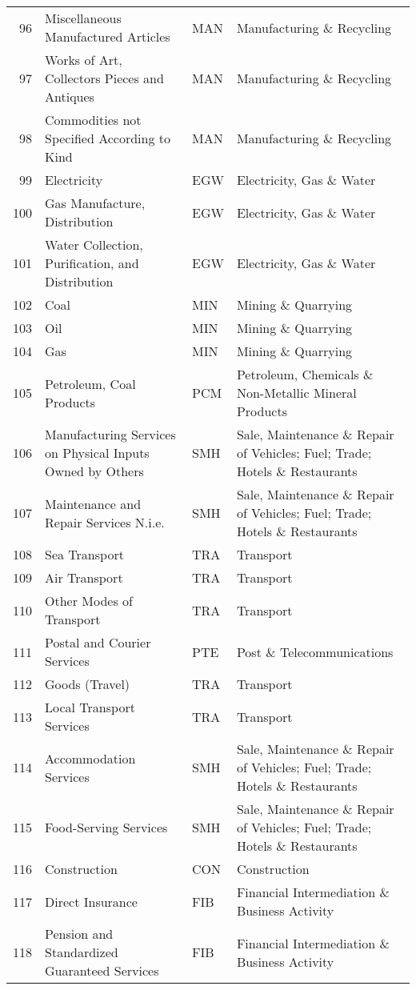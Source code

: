 \documentclass[a4paper]{article}
\begin{document}
\begin{table}[ht]
{\begin{tabular}{rlll}
  96 & Miscellaneous Manufactured Articles & MAN & Manufacturing \& Recycling \\ 
  97 & Works of Art, Collectors Pieces and Antiques & MAN & Manufacturing \& Recycling \\ 
  98 & Commodities not Specified According to Kind & MAN & Manufacturing \& Recycling \\ 
  99 & Electricity & EGW & Electricity, Gas \& Water \\ 
  100 & Gas Manufacture, Distribution & EGW & Electricity, Gas \& Water \\ 
  101 & Water Collection, Puriﬁcation, and Distribution & EGW & Electricity, Gas \& Water \\ 
  102 & Coal & MIN & Mining \& Quarrying \\ 
  103 & Oil & MIN & Mining \& Quarrying \\ 
  104 & Gas & MIN & Mining \& Quarrying \\ 
  105 & Petroleum, Coal Products & PCM & Petroleum, Chemicals \& Non-Metallic Mineral Products \\ 
  106 & Manufacturing Services on Physical Inputs Owned by Others & SMH & Sale, Maintenance \& Repair of Vehicles; Fuel; Trade; Hotels \& Restaurants \\ 
  107 & Maintenance and Repair Services N.i.e. & SMH & Sale, Maintenance \& Repair of Vehicles; Fuel; Trade; Hotels \& Restaurants \\ 
  108 & Sea Transport & TRA & Transport \\ 
  109 & Air Transport & TRA & Transport \\ 
  110 & Other Modes of Transport & TRA & Transport \\ 
  111 & Postal and Courier Services & PTE & Post \& Telecommunications \\ 
  112 & Goods (Travel) & TRA & Transport \\ 
  113 & Local Transport Services & TRA & Transport \\ 
  114 & Accommodation Services & SMH & Sale, Maintenance \& Repair of Vehicles; Fuel; Trade; Hotels \& Restaurants \\ 
  115 & Food-Serving Services & SMH & Sale, Maintenance \& Repair of Vehicles; Fuel; Trade; Hotels \& Restaurants \\ 
  116 & Construction & CON & Construction \\ 
  117 & Direct Insurance & FIB & Financial Intermediation \& Business Activity \\ 
  118 & Pension and Standardized Guaranteed Services & FIB & Financial Intermediation \& Business Activity \\ 

\end{tabular}}
\end{table}
\end{document}
